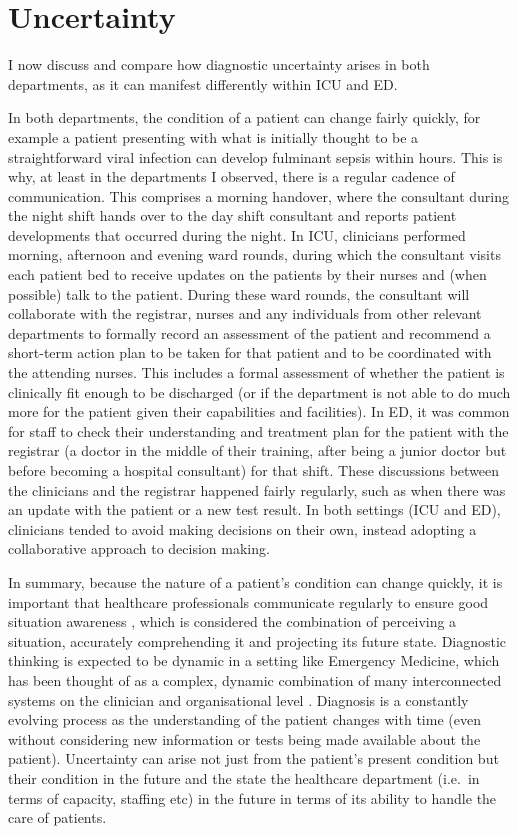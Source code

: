 \documentclass[a4paper, nobind]{templates/ociamthesis}
\begin{document}
\section{Uncertainty}\label{uncertainty}

I now discuss and compare how diagnostic uncertainty arises in both departments, as it can manifest differently within ICU and ED.

\hfill\break
In both departments, the condition of a patient can change fairly quickly, for example a patient presenting with what is initially thought to be a straightforward viral infection can develop fulminant sepsis within hours. This is why, at least in the departments I observed, there is a regular cadence of communication. This comprises a morning handover, where the consultant during the night shift hands over to the day shift consultant and reports patient developments that occurred during the night. In ICU, clinicians performed morning, afternoon and evening ward rounds, during which the consultant visits each patient bed to receive updates on the patients by their nurses and (when possible) talk to the patient. During these ward rounds, the consultant will collaborate with the registrar, nurses and any individuals from other relevant departments to formally record an assessment of the patient and recommend a short-term action plan to be taken for that patient and to be coordinated with the attending nurses. This includes a formal assessment of whether the patient is clinically fit enough to be discharged (or if the department is not able to do much more for the patient given their capabilities and facilities). In ED, it was common for staff to check their understanding and treatment plan for the patient with the registrar (a doctor in the middle of their training, after being a junior doctor but before becoming a hospital consultant) for that shift. These discussions between the clinicians and the registrar happened fairly regularly, such as when there was an update with the patient or a new test result. In both settings (ICU and ED), clinicians tended to avoid making decisions on their own, instead adopting a collaborative approach to decision making.

\hfill\break
In summary, because the nature of a patient's condition can change quickly, it is important that healthcare professionals communicate regularly to ensure good situation awareness \autocite{endsley_toward_1995}, which is considered the combination of perceiving a situation, accurately comprehending it and projecting its future state. Diagnostic thinking is expected to be dynamic in a setting like Emergency Medicine, which has been thought of as a complex, dynamic combination of many interconnected systems on the clinician and organisational level \autocite{widmer_complex_2018}. Diagnosis is a constantly evolving process as the understanding of the patient changes with time (even without considering new information or tests being made available about the patient). Uncertainty can arise not just from the patient's present condition but their condition in the future and the state the healthcare department (i.e.~in terms of capacity, staffing etc) in the future in terms of its ability to handle the care of patients.
\end{document}
